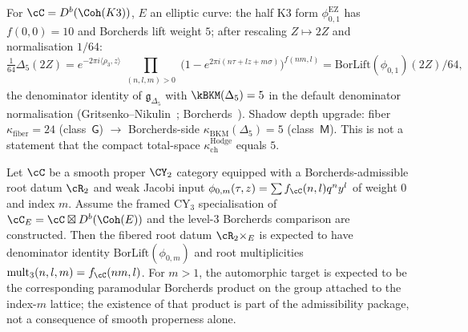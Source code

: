 \begin{example}
\label{ex:thy-k3e-igusa}
For $\cC = D^b(\Coh(K3))$, $E$ an elliptic curve: the half K3 form
$\phi_{0,1}^{\mathrm{EZ}}$ has $f(0,0)=10$ and Borcherds lift weight $5$;
after rescaling $Z\mapsto 2Z$ and normalisation $1/64$:
\[
 \tfrac{1}{64}\Delta_5(2Z)
 = e^{-2\pi i\langle\rho_3,z\rangle}
 \prod_{\substack{(n,l,m)>0}}
 \bigl(1-e^{2\pi i(n\tau+lz+m\sigma)}\bigr)^{f(nm,l)}
 = \mathrm{BorLift}(\phi_{0,1})(2Z)/64,
\]
the denominator identity of $\mathfrak{g}_{\Delta_5}$ with
$\kBKM(\Delta_5)=5$ in the default denominator normalisation
\textup{(}Gritsenko--Nikulin~\cite{GritsenkoNikulin1998};
Borcherds~\cite{Borcherds1995}\textup{)}. Shadow depth upgrade:
fiber $\kappa_{\mathrm{fiber}}=24$ (class~$\mathsf{G}$) $\to$
Borcherds-side $\kappa_{\mathrm{BKM}}(\Delta_5)=5$ (class~$\mathsf{M}$). This
is not a statement that the compact total-space $\kappa_{\mathrm{ch}}^{\mathrm{Hodge}}$
equals $5$.
\end{example}

\begin{conjecture}
\label{conj:thy-fibration-general}
\ClaimStatusConjectured
Let $\cC$ be a smooth proper $\CY_2$ category equipped with a
Borcherds-admissible root datum $\cR_2$ and weak Jacobi input
$\phi_{0,m}(\tau,z)=\sum f_\cC(n,l)q^ny^l$ of weight $0$ and index
$m$.  Assume the framed CY$_3$ specialisation of
$\cC_E=\cC\boxtimes D^b(\Coh(E))$ and the level-$3$ Borcherds
comparison are constructed.  Then the fibered root datum
$\cR_2\times_E$ is expected to have denominator identity
$\mathrm{BorLift}(\phi_{0,m})$ and root multiplicities
$\mathrm{mult}_3(n,l,m)=f_\cC(nm,l)$.  For $m>1$, the automorphic
target is expected to be the corresponding paramodular Borcherds
product on the group attached to the index-$m$ lattice; the existence of
that product is part of the admissibility package, not a consequence of
smooth properness alone.
\end{conjecture}

